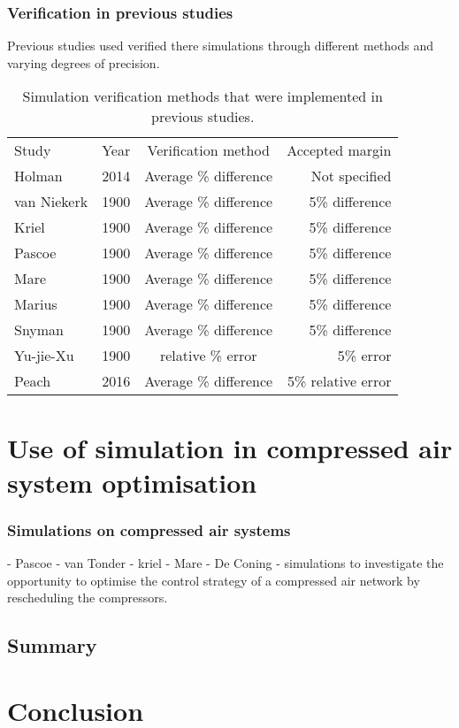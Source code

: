  	\subsubsection{Verification in previous studies}
 	Previous studies used verified there simulations through different methods and varying degrees of precision. \\
 	\begin{table}[h]
 		\centering
 		\begin{tabular}{p{5cm}ccr}
 			\hline
 			Study & Year & Verification method & Accepted margin\\
 			\hhline{====}
 			Holman \cite{Holman2014Masters} & 2014 & Average \% difference & Not specified  \\
 			van Niekerk \cite{vanNiekerk2012Value} & 1900 & Average \% difference & 5\% difference \\
 			Kriel \cite{Marais2012PhD} &  1900 & Average \% difference & 5\% difference \\
 			Pascoe \cite{Pascoe2016Masters} & 1900 & Average \% difference & 5\% difference \\	
 			Mare \cite{Mare2016PhD} & 1900 & Average \% difference & 5\% difference  \\
 			Marius \cite{Marais2012PhD} & 1900 & Average \% difference & 5\% difference\\	
 			Snyman	\cite{Snyman2011Masters} & 1900 & Average \% difference & 5\% difference\\	
 			Yu-jie-Xu \cite{xu2016modeling}& 1900 & relative \% error & 5\%  error\\	
 			Peach \cite{Peach2016Masters}& 2016 & Average \% difference & 5\% relative error\\
 			\hline
 		\end{tabular} 
 		\caption{Simulation verification methods that were implemented in previous studies.}
 		\label{table: Verification studies}
 	\end{table}
\clearpage	
\section{Use of simulation in compressed air system optimisation}
	

	\subsubsection{Simulations on compressed air systems}
		- Pascoe 
		- van Tonder
		- kriel
		- Mare
		- De Coning -  simulations to investigate the opportunity to optimise the control strategy of a compressed air network by rescheduling the compressors.
	\subsection{Summary}
	\label{Shortcomings of previous work}
		\clearpage	
\section{Conclusion}